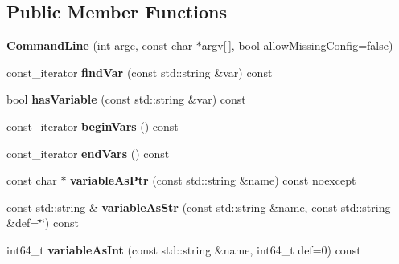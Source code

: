 \subsection*{Public Member Functions}
\begin{DoxyCompactItemize}
\item 
\mbox{\label{classtheoria_1_1util_1_1CommandLine_a7e753aa91c5a0018a1bec3439839852d}} 
{\bfseries Command\+Line} (int argc, const char $\ast$argv\mbox{[}$\,$\mbox{]}, bool allow\+Missing\+Config=false)
\item 
\mbox{\label{classtheoria_1_1util_1_1CommandLine_adedd9cbacd108ee1b5454570a200f497}} 
const\+\_\+iterator {\bfseries find\+Var} (const std\+::string \&var) const
\item 
\mbox{\label{classtheoria_1_1util_1_1CommandLine_adb659582b2ce6b2ef9666562ac05bd5f}} 
bool {\bfseries has\+Variable} (const std\+::string \&var) const
\item 
\mbox{\label{classtheoria_1_1util_1_1CommandLine_a65446583fe4fe7d3a9ae1ed4dd23185e}} 
const\+\_\+iterator {\bfseries begin\+Vars} () const
\item 
\mbox{\label{classtheoria_1_1util_1_1CommandLine_add5993c46a68548f70a75b2eb9431558}} 
const\+\_\+iterator {\bfseries end\+Vars} () const
\item 
\mbox{\label{classtheoria_1_1util_1_1CommandLine_a26dab1188ed94478a4eaaf1b9e1ed19e}} 
const char $\ast$ {\bfseries variable\+As\+Ptr} (const std\+::string \&name) const noexcept
\item 
\mbox{\label{classtheoria_1_1util_1_1CommandLine_aa9310fbfe3b1397bb9288eee7aae4abc}} 
const std\+::string \& {\bfseries variable\+As\+Str} (const std\+::string \&name, const std\+::string \&def=\char`\"{}\char`\"{}) const
\item 
\mbox{\label{classtheoria_1_1util_1_1CommandLine_a182748d9cfb606cbf45ee7dc7e016a52}} 
int64\+\_\+t {\bfseries variable\+As\+Int} (const std\+::string \&name, int64\+\_\+t def=0) const

\end{DoxyCompactItemize}
